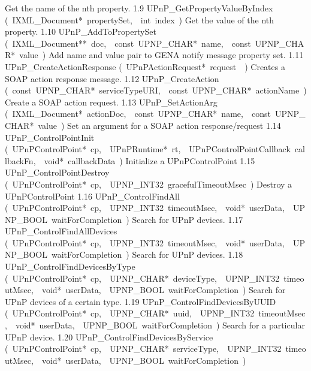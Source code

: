 \documentclass{article}
\begin{document}
\begin{cxxentry}
\begin{cxxnames}
        {Get the name of the nth property. }
        {1.9}
        {UPnP\_GetPropertyValueByIndex}
        {(\ IXML\_Document*\ propertySet,\ \ int\ index\ )}
        {Get the value of the nth property. }
        {1.10}
        {UPnP\_AddToPropertySet}
        {(\ IXML\_Document**\ doc,\ \ const\ UPNP\_CHAR*\ name,\ \ const\ UPNP\_CHAR*\ value\ )}
        {Add name and value pair to GENA notify message property set. }
        {1.11}
        {UPnP\_CreateActionResponse}
        {(\ UPnPActionRequest*\ request\ \ )}
        {Creates a SOAP action response message. }
        {1.12}
        {UPnP\_CreateAction}
        {(\ const\ UPNP\_CHAR*\ serviceTypeURI,\ \ const\ UPNP\_CHAR*\ actionName\ )}
        {Create a SOAP action request. }
        {1.13}
        {UPnP\_SetActionArg}
        {(\ IXML\_Document*\ actionDoc,\ \ const\ UPNP\_CHAR*\ name,\ \ const\ UPNP\_CHAR*\ value\ )}
        {Set an argument for a SOAP action response/request }
        {1.14}
        {UPnP\_ControlPointInit}
        {(\ UPnPControlPoint*\ cp,\ \ UPnPRuntime*\ rt,\ \ UPnPControlPointCallback\ callbackFn,\ \ void*\ callbackData\ )}
        {Initialize a UPnPControlPoint }
        {1.15}
        {UPnP\_ControlPointDestroy}
        {(\ UPnPControlPoint*\ cp,\ \ UPNP\_INT32\ gracefulTimeoutMsec\ )}
        {Destroy a UPnPControlPoint }
        {1.16}
        {UPnP\_ControlFindAll}
        {(\ UPnPControlPoint*\ cp,\ \ UPNP\_INT32\ timeoutMsec,\ \ void*\ userData,\ \ UPNP\_BOOL\ waitForCompletion\ )}
        {Search for UPnP devices. }
        {1.17}
        {UPnP\_ControlFindAllDevices}
        {(\ UPnPControlPoint*\ cp,\ \ UPNP\_INT32\ timeoutMsec,\ \ void*\ userData,\ \ UPNP\_BOOL\ waitForCompletion\ )}
        {Search for UPnP devices. }
        {1.18}
        {UPnP\_ControlFindDevicesByType}
        {(\ UPnPControlPoint*\ cp,\ \ UPNP\_CHAR*\ deviceType,\ \ UPNP\_INT32\ timeoutMsec,\ \ void*\ userData,\ \ UPNP\_BOOL\ waitForCompletion\ )}
        {Search for UPnP devices of a certain type. }
        {1.19}
        {UPnP\_ControlFindDevicesByUUID}
        {(\ UPnPControlPoint*\ cp,\ \ UPNP\_CHAR*\ uuid,\ \ UPNP\_INT32\ timeoutMsec,\ \ void*\ userData,\ \ UPNP\_BOOL\ waitForCompletion\ )}
        {Search for a particular UPnP device. }
        {1.20}
        {UPnP\_ControlFindDevicesByService}
        {(\ UPnPControlPoint*\ cp,\ \ UPNP\_CHAR*\ serviceType,\ \ UPNP\_INT32\ timeoutMsec,\ \ void*\ userData,\ \ UPNP\_BOOL\ waitForCompletion\ )}

\end{cxxnames}
\end{cxxentry}
\end{document}
